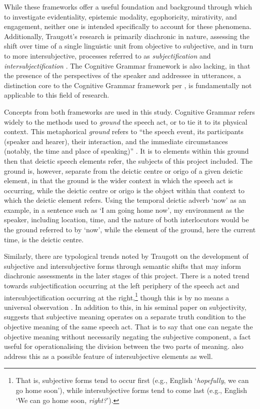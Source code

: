 While these frameworks offer a useful foundation and background through which to investigate evidentiality, epistemic modality, egophoricity, mirativity, and engagement, neither one is intended specifically to account for these phenomena. Additionally, Traugott's research is primarily diachronic in nature, assessing the shift over time of a single linguistic unit from objective to subjective, and in turn to more intersubjective, processes referred to as \textit{subjectification} and \textit{intersubjectification} \cites{Traugott1995}{Traugott2014}. The Cognitive Grammar framework is also lacking, in that the presence of the perspectives of the speaker and addressee in utterances, a distinction core to the Cognitive Grammar framework per , is fundamentally not applicable to this field of research.

Concepts from both frameworks are used in this study. Cognitive Grammar refers widely to the methods used to \textit{ground} the speech act, or to tie it to its physical context. This metaphorical \textit{ground} refers to ``the speech event, its participants (speaker and hearer), their interaction, and the immediate circumstances (notably, the time and place of speaking)'' \cite[259]{Langacker2008}. It is to elements within this ground then that deictic speech elements refer, the subjects of this project included. The ground is, however, separate from the deictic centre or origo of a given deictic element, in that the ground is the wider context in which the speech act is occurring, while the deictic centre or origo is the object within that context to which the deictic element refers. Using the temporal deictic adverb `now' as an example, in a sentence such as `I am going home now', my environment as the speaker, including location, time, and the nature of both interlocutors would be the ground referred to by `now', while the element of the ground, here the current time, is the deictic centre.

Similarly, there are typological trends noted by Traugott on the development of subjective and intersubjective forms through semantic shifts that may inform diachronic assessments in the later stages of this project. There is a noted trend towards subjectification occurring at the left periphery of the speech act and intersubjectification occurring at the right,\footnote{That is, subjective forms tend to occur first (e.g., English `\textit{hopefully}, we can go home soon'), while intersubjective forms tend to come last (e.g., English `We can go home soon, \textit{right?}').} though this is by no means a universal observation \cite{Traugott2014}. In addition to this, in his seminal paper on subjectivity,  suggests that subjective meaning operates on a separate truth condition to the objective meaning of the same speech act. That is to say that one can negate the objective meaning without necessarily negating the subjective component, a fact useful for operationalising the division between the two parts of meaning.  also address this as a possible feature of intersubjective elements as well.


